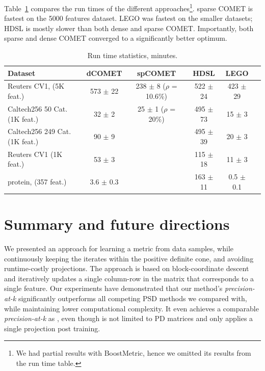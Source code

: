 \documentclass[twoside,11pt]{article}
\newcommand{\tabref}[1]{Table~\ref{#1}}
\begin{document}
\tabref{runtimes} compares the run times of the different approaches\footnote{We had partial results with BoostMetric, hence we omitted its results from the run time table.}. sparse COMET is fastest on the 5000 features dataset. LEGO was fastest on the smaller datasets; HDSL is mostly slower than both dense and sparse COMET. Importantly, both sparse and dense COMET converged to a significantly better optimum.


\begin{table}[t]
\captionsetup{font=small}
\caption{Run time statistics, minutes.}
\label{runtimes}
\vskip 0.15in
\begin{center}
\begin{small}
\begin{sc}
\begin{tabular}{lccccr}
\hline
Dataset     & dCOMET           & spCOMET            & HDSL             & LEGO            \\ 
\hline
Reuters CV1, (5K feat.)&  573 $\pm$    22 &   238 $\pm$    8 ($\rho$ = 10.6\%) &522 $\pm$    24 &   423 $\pm$    29 & \\ 
Caltech256 50 Cat. (1K feat.)  &    32 $\pm$     2 &        25 $\pm$  1 ($\rho$ = 20\%)     &   495 $\pm$    73 &     15 $\pm$     3 &\\ 
Caltech256 249 Cat. (1K feat.) &   90 $\pm$     9 &                  &  495 $\pm$    39  &     20 $\pm$     3 &\\
Reuters CV1 (1K feat.) &   53 $\pm$     3 &                  &   115 $\pm$    18 &     11 $\pm$     3 &\\ 
protein, (357 feat.)  &    3.6 $\pm$     0.3 &                  &   163 $\pm$    11 &      0.5 $\pm$     0.1 &\\ 
\hline
\end{tabular}
\end{sc}
\end{small}
\end{center}
\vskip -0.1in
\end{table}

\section{Summary and future directions}
We presented an approach for learning a metric from data samples, while continuously keeping the iterates within the positive definite cone, and avoiding runtime-costly projections. The approach is based on block-coordinate descent and iteratively updates a single column-row in the matrix that corresponds to a single feature. Our experiments have demonstrated that our method's \textit{precision-at-k} significantly outperforms all competing PSD methods we compared with, while maintaining lower computational complexity. It even achieves a comparable \textit{precision-at-k} as \citep{OASIS}, even though \citep{OASIS} is not limited to PD matrices and only applies a single projection post training.
\end{document}
